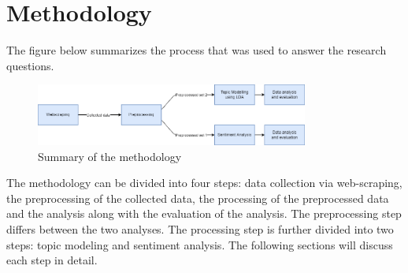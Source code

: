 \section{Methodology}


The figure below summarizes the process that was used to answer the research questions.

\begin{figure}[h]
    \centering
    \includegraphics[width=0.8\textwidth]{resources/methodology.png}
    \caption{Summary of the methodology}
    \label{fig:methodology}
\end{figure}

The methodology can be divided into four steps: data collection via web-scraping, the preprocessing of the collected data, the processing of the preprocessed data and the analysis along with the evaluation of the analysis. The preprocessing step differs between the two analyses. The processing step is further divided into two steps: topic modeling and sentiment analysis. The following sections will discuss each step in detail.